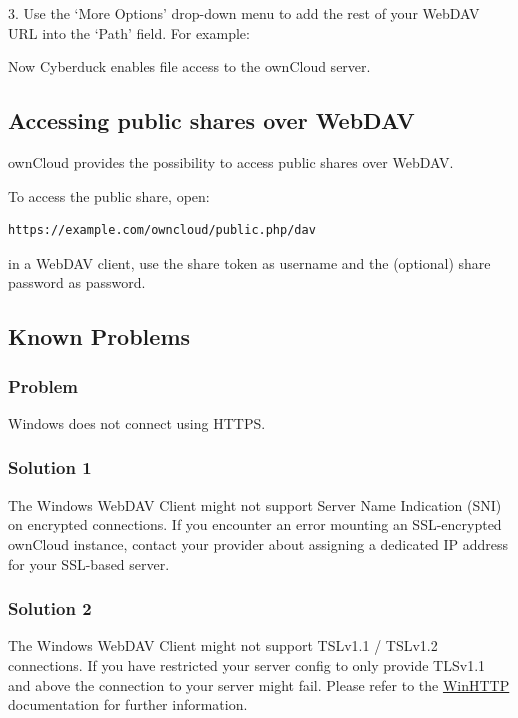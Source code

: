 \documentclass[letterpaper,10pt,english]{sphinxmanual}
\begin{document}
3. Use the `More Options' drop-down menu to add the rest of your WebDAV URL into
the `Path' field. For example:
\begin{quote}

\end{quote}

Now Cyberduck enables file access to the ownCloud server.


\subsection{Accessing public shares over WebDAV}
\label{files/access_webdav:accessing-public-shares-over-webdav}
ownCloud provides the possibility to access public shares over WebDAV.

To access the public share, open:

\begin{Verbatim}[commandchars=\\\{\}]
https://example.com/owncloud/public.php/dav
\end{Verbatim}

in a WebDAV client, use the share token as username and the (optional) share password
as password.


\subsection{Known Problems}
\label{files/access_webdav:known-problems}

\subsubsection{Problem}
\label{files/access_webdav:id3}
Windows does not connect using HTTPS.


\subsubsection{Solution 1}
\label{files/access_webdav:solution-1}
The Windows WebDAV Client might not support Server Name Indication (SNI) on
encrypted connections. If you encounter an error mounting an SSL-encrypted
ownCloud instance, contact your provider about assigning a dedicated IP address
for your SSL-based server.


\subsubsection{Solution 2}
\label{files/access_webdav:solution-2}
The Windows WebDAV Client might not support TSLv1.1 / TSLv1.2 connections. If
you have restricted your server config to only provide TLSv1.1 and above the
connection to your server might fail. Please refer to the \href{https://msdn.microsoft.com/en-us/library/windows/desktop/aa382925.aspx\#WinHTTP\_5.1\_Features}{WinHTTP} documentation
for further information.
\end{document}
